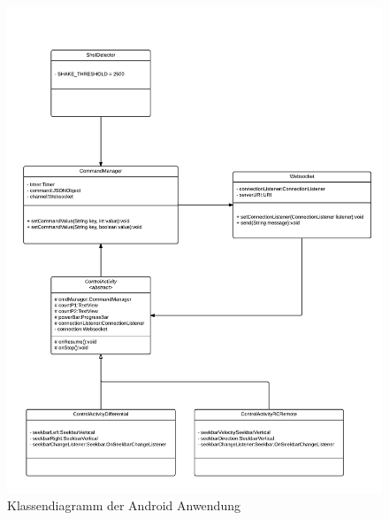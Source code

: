 \begin{figure}
	\includegraphics[width=\textwidth]{images/uml_android_app.pdf}
	\caption{Klassendiagramm der Android Anwendung}
	\label{fig:android_uml}
\end{figure}



